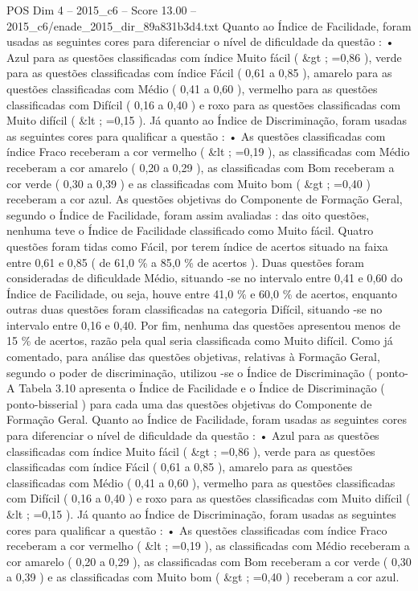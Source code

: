 \begin{textsample}{POS Dim 4 – 2015\_c6 – Score 13.00 – 2015\_c6/enade\_2015\_dir\_89a831b3d4.txt}
Quanto ao Índice de Facilidade, foram usadas as seguintes cores para diferenciar o nível de dificuldade da questão : • Azul para as questões classificadas com índice Muito fácil ( \&gt ; =0,86 ), verde para as questões classificadas com índice Fácil ( 0,61 a 0,85 ), amarelo para as questões classificadas com Médio ( 0,41 a 0,60 ), vermelho para as questões classificadas com Difícil ( 0,16 a 0,40 ) e roxo para as questões classificadas com Muito difícil ( \&lt ; =0,15 ).
Já quanto ao Índice de Discriminação, foram usadas as seguintes cores para qualificar a questão : • As questões classificadas com índice Fraco receberam a cor vermelho ( \&lt ; =0,19 ), as classificadas com Médio receberam a cor amarelo ( 0,20 a 0,29 ), as classificadas com Bom receberam a cor verde ( 0,30 a 0,39 ) e as classificadas com Muito bom ( \&gt ; =0,40 ) receberam a cor azul.
As questões objetivas do Componente de Formação Geral, segundo o Índice de Facilidade, foram assim avaliadas : das oito questões, nenhuma teve o Índice de Facilidade classificado como Muito fácil.
Quatro questões foram tidas como Fácil, por terem índice de acertos situado na faixa entre 0,61 e 0,85 ( de 61,0 \% a 85,0 \% de acertos ).
Duas questões foram consideradas de dificuldade Médio, situando -se no intervalo entre 0,41 e 0,60 do Índice de Facilidade, ou seja, houve entre 41,0 \% e 60,0 \% de acertos, enquanto outras duas questões foram classificadas na categoria Difícil, situando -se no intervalo entre 0,16 e 0,40.
Por fim, nenhuma das questões apresentou menos de 15 \% de acertos, razão pela qual seria classificada como Muito difícil.
Como já comentado, para análise das questões objetivas, relativas à Formação Geral, segundo o poder de discriminação, utilizou -se o Índice de Discriminação ( ponto- A Tabela 3.10 apresenta o Índice de Facilidade e o Índice de Discriminação ( ponto-bisserial ) para cada uma das questões objetivas do Componente de Formação Geral.
Quanto ao Índice de Facilidade, foram usadas as seguintes cores para diferenciar o nível de dificuldade da questão : • Azul para as questões classificadas com índice Muito fácil ( \&gt ; =0,86 ), verde para as questões classificadas com índice Fácil ( 0,61 a 0,85 ), amarelo para as questões classificadas com Médio ( 0,41 a 0,60 ), vermelho para as questões classificadas com Difícil ( 0,16 a 0,40 ) e roxo para as questões classificadas com Muito difícil ( \&lt ; =0,15 ).
Já quanto ao Índice de Discriminação, foram usadas as seguintes cores para qualificar a questão : • As questões classificadas com índice Fraco receberam a cor vermelho ( \&lt ; =0,19 ), as classificadas com Médio receberam a cor amarelo ( 0,20 a 0,29 ), as classificadas com Bom receberam a cor verde ( 0,30 a 0,39 ) e as classificadas com Muito bom ( \&gt ; =0,40 ) receberam a cor azul.

\end{textsample}
